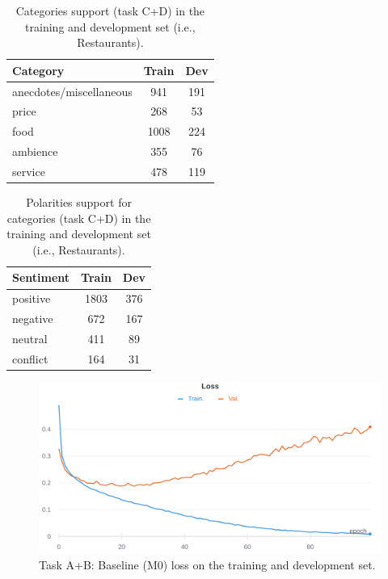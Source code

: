 \documentclass[11pt,a4paper]{article}
\begin{document}
	\begin{table}[h]
		\centering
		\begin{tabular}{@{}lcc@{}}
			\toprule
			\textbf{Category}         & Train     & Dev \\ \midrule
			anecdotes/miscellaneous   & 941       & 191     \\
			price                     & 268       & 53      \\
			food                      & 1008      & 224     \\
			ambience                  & 355       & 76      \\
			service                   & 478       & 119     \\ \bottomrule
		\end{tabular}
		\caption{Categories support (task C+D) in the training and development set (i.e., Restaurants).}
		\label{tab:my-table}
	\end{table}
	
	\begin{table}[h]
		\centering
		\begin{tabular}{@{}lcc@{}}
			\toprule
			\textbf{Sentiment} & Train & Dev \\ \midrule
			positive           & 1803  & 376 \\
			negative           & 672   & 167 \\
			neutral            & 411   & 89  \\
			conflict           & 164   & 31  \\ \bottomrule
		\end{tabular}
		\caption{Polarities support for categories (task C+D) in the training and development set (i.e., Restaurants).}
		\label{tab:my-table}
	\end{table}

	\begin{figure}[h]
		\centering
		\includegraphics[width=1\columnwidth]{M0_ab_loss.png}
		\caption{Task A+B: Baseline (M0) loss on the training and development set.}
		\label{fig:M0_loss}
	\end{figure}
\end{document}
